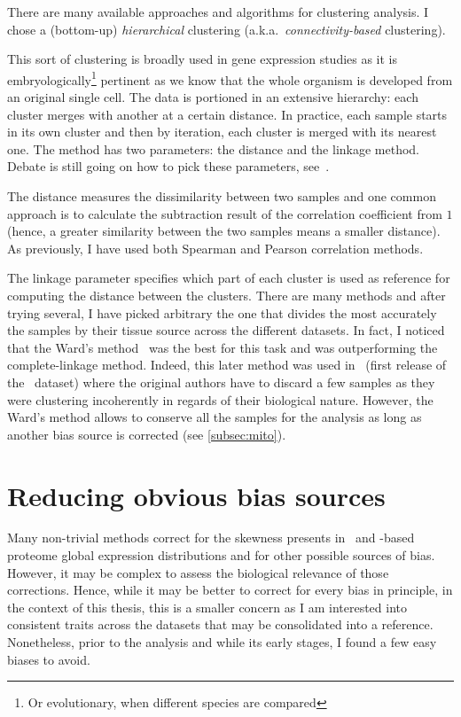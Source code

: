 There are many available approaches and algorithms for clustering analysis.
I chose a (bottom-up) \emph{hierarchical} clustering (a.k.a.\
\emph{connectivity-based} clustering).

This sort of clustering is broadly used in gene expression studies as it is
embryologically\footnote{Or evolutionary, when different species are compared}
pertinent as we know that the whole organism is developed from
an original single cell. The data is portioned in an extensive hierarchy:
each cluster merges with another at a certain distance.
In practice, each sample starts in its own cluster and then
by iteration, each cluster is merged with its nearest one.
The method has two parameters: the distance and the linkage method.
Debate is still going on how to pick these parameters, see~.

The distance measures the dissimilarity between two samples and one common
approach is to calculate the subtraction result of
the correlation coefficient from $1$ (hence, a greater similarity between the two
samples means a smaller distance). As previously, I have used both Spearman
and Pearson correlation methods.

The linkage parameter specifies which part of each cluster is used as reference
for computing the distance between the clusters. There are many methods and after
trying several, I have picked arbitrary the one that divides the most accurately
the samples by their tissue source across the different datasets.
In fact, I noticed that the Ward's method~\mycite{Ward1963}
was the best for this task and was outperforming the complete-linkage method.
Indeed, this later method was used in~\mycite{Uhlen2014}
(first release of the \uhlen\ dataset) where
the original authors have to discard a few samples as they were clustering
incoherently in regards of their biological nature.
However, the Ward's method allows to conserve all the samples for the analysis
as long as another bias source is corrected (see \cref{subsec:mito}).


\section{Reducing obvious bias sources}

Many non-trivial methods correct for the skewness presents in
\Rnaseq\ and \ms-based proteome global expression distributions
and for other possible sources of bias.
However, it may be complex to assess the biological relevance of those corrections.
Hence, while it may be better to correct for every bias in principle,
in the context of this thesis, this is a smaller concern as I am interested into
consistent traits across the datasets that may be consolidated into a reference.
Nonetheless, prior to the analysis and while its early stages,
I found a few easy biases to avoid.

